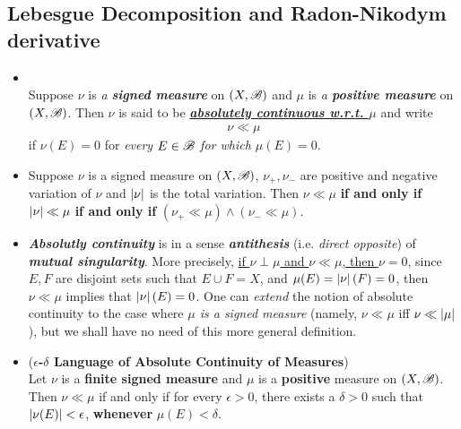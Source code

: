 \documentclass[11pt]{article}
\begin{document}
\subsection{Lebesgue Decomposition and Radon-Nikodym derivative}
\begin{itemize}
\item \begin{definition}\citep{folland2013real}\\
Suppose $\nu$ is \emph{a \textbf{signed measure}} on $(X,{\mathscr B})$ and $\mu$ is \emph{a \textbf{positive measure}} on $(X,{\mathscr B})$. Then $\nu$ is said to be \underline{\emph{\textbf{absolutely continuous w.r.t. $\mu$}}} and write
\begin{align*}
\nu \ll \mu 
\end{align*}
if $\nu(E)=0$ for \emph{every $E\in {\mathscr B}$ for which $\mu(E)=0$}. 
\end{definition}

\item
\begin{proposition}
Suppose $\nu$ is a signed measure on $(X,{\mathscr B})$,  $ \nu_{+}, \nu_{-}$ are positive and negative variation of $\nu$ and $\left\lvert \nu \right\rvert$ is the total variation. Then 
$\nu \ll \mu $ \textbf{if and only if} $\left\lvert \nu \right\rvert \ll \mu$ \textbf{if and only if} $(\nu_{+} \ll  \mu) \wedge (\nu_{-} \ll  \mu)$.
\end{proposition}

\item \begin{remark}
\emph{\textbf{Absolutly continuity}} is in a sense \emph{\textbf{antithesis}} (i.e. \emph{direct opposite}) of \emph{\textbf{mutual singularity}}. More precisely, 
\underline{if $\nu \perp \mu$ and $\nu \ll \mu$, then $\nu = 0$}, since $E, F$ are disjoint sets such that $E\cup F= X$, and $\mu(E)= \left\lvert \nu \right\rvert(F)= 0$, then $\nu \ll \mu$ implies that $\left\lvert \nu \right\rvert(E)= 0$. One can \emph{extend} the notion of absolute continuity to the case where \emph{$\mu$ is a signed measure} (namely, $\nu \ll \mu$ iff $\nu \ll \left\lvert \mu \right\rvert$), but we shall have no need of this more general definition.
 \end{remark}
 
 \item \begin{theorem} (\textbf{$\epsilon$-$\delta$ Language of Absolute Continuity of Measures})\\
Let $\nu$ is a \textbf{finite signed measure} and $\mu$ is a \textbf{positive} measure on $(X,{\mathscr B})$. Then $\nu \ll \mu$ if and only if for every $\epsilon>0$, there exists a $\delta>0$ such that $\left\lvert \nu(E) \right\rvert<\epsilon$, \textbf{whenever} $\mu(E)< \delta$.
\end{theorem}


\end{itemize}
\end{document}
